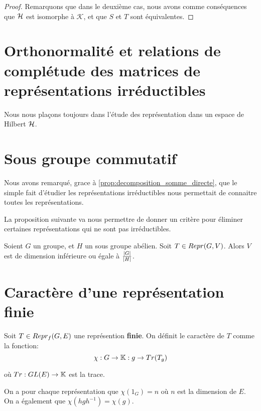 \begin{proof}
	Remarquons que dans le deuxième cas, nous avons comme conséquences que
	$\mathcal{H}$ est isomorphe à $\mathcal{K}$, et que $S$ et $T$ sont
	équivalentes.
\end{proof}

\section{Orthonormalité et relations de complétude des matrices de
représentations irréductibles}

Nous nous plaçons toujours dans l'étude des représentation dans un espace de
Hilbert $\mathcal{H}$.



\section{Sous groupe commutatif}

Nous avons remarqué, grace à \ref{prop:decomposition_somme_directe}, que le
simple fait d'étudier les représentations irréductibles nous permettait de
connaitre toutes les représentations.

La proposition suivante va nous permettre de donner un critère pour
éliminer certaines représentations qui ne sont pas irréductibles.

\begin{proposition}
	Soient $G$ un groupe, et $H$ un sous groupe abélien.
	Soit $T \in Repr(G, V)$.
	Alors $V$ est de dimension inférieure ou égale à
	$\frac{|G|}{|H|}$.
\end{proposition}

\section{Caractère d'une représentation finie}

\begin{definition}
	Soit $T \in Repr_{f}(G, E)$ une représention \textbf{finie}.
	On définit le caractère de $T$ comme la fonction:
	\begin{equation}
		\chi : G \rightarrow \mathbb{K} : g \rightarrow Tr(T_{g})
	\end{equation}

	où $Tr : GL(E) \rightarrow \mathbb{K}$ est la trace.
\end{definition}

On a pour chaque représentation que $\chi(1_{G}) = n$ où $n$ est la dimension de
$E$.
On a également que $\chi(h g h^{-1}) = \chi(g)$.


